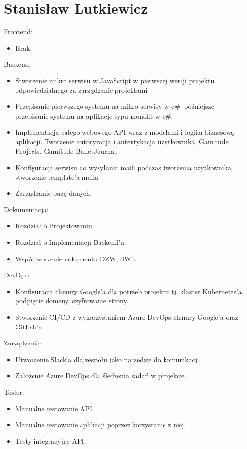 \documentclass[a4paper,11pt]{report}
\begin{document}
\section {Stanisław Lutkiewicz}
Frontend:
\begin{itemize}
	\item Brak.
\end{itemize}
Backend:
\begin{itemize}
	\item Stworzenie mikro serwisu w JavaScript w pierwszej wersji projektu odpowiedzialnego za zarządzanie projektami. 
	\item Przepisanie pierwszego systemu na mikro serwisy w c\#, późniejsze przepisanie systemu na aplikacje typu monolit w c\#.
	\item Implementacja całego webowego API wraz z modelami i logiką biznesową aplikacji.
	Tworzenie autoryzacja i autentykacja użytkownika, Gamitude Projects, Gamitude BulletJournal.
	\item Konfiguracja serwisu do wysyłania maili podczas tworzenia użytkownika, stworzenie template'a maila.
	\item Zarządzanie bazą danych.
\end{itemize}
Dokumentacja:
\begin{itemize}
	\item Rozdział o Projektowaniu.
	\item Rozdział o Implementacji Backend'u.
	\item Współtworzenie dokumentu DZW, SWS.
\end{itemize}
DevOps:
\begin{itemize}
	\item Konfiguracja chmury Google'a dla potrzeb projektu tj. klaster Kubernetes'a, podpięcie domeny, szyfrowanie strony.
	\item Stworzenie CI/CD z wykorzystaniem Azure DevOps chmury Google'a oraz GitLab'a. 
\end{itemize}
Zarządzanie:
\begin{itemize}
	\item Utworzenie Slack'a dla zespołu jako narzędzie do komunikacji.
	\item Założenie Azure DevOps dla śledzenia zadań w projekcie.
\end{itemize}
Tester:
\begin{itemize}
	\item Manualne testowanie API.
	\item Manualne testowanie aplikacji poprzez korzystanie z niej.
	\item Testy integracyjne API.
\end{itemize}
\end{document}
